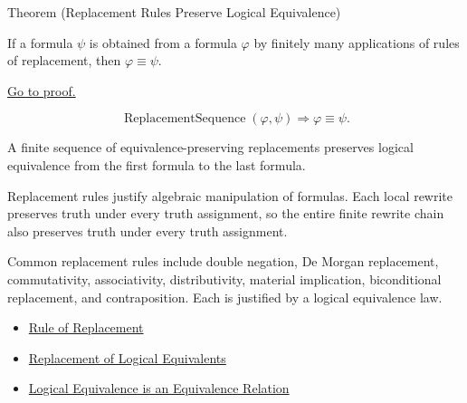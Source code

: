 \begin{theorembox}{Theorem (Replacement Rules Preserve Logical Equivalence)}
\begin{theorem}
\label{thm:replacement-rules-preserve-logical-equivalence-propositional-logic}
If a formula \(\psi\) is obtained from a formula \(\varphi\) by finitely many
applications of rules of replacement, then \(\varphi\equiv\psi\).

\noindent\hyperref[prf:replacement-rules-preserve-logical-equivalence-propositional-logic]{Go to proof.}
\end{theorem}
\end{theorembox}

\begin{remark*}
\[
\operatorname{ReplacementSequence}(\varphi,\psi)
\Longrightarrow
\varphi\equiv\psi.
\]
\end{remark*}

\begin{remark*}
A finite sequence of equivalence-preserving replacements preserves logical
equivalence from the first formula to the last formula.
\end{remark*}

\begin{remark*}[Interpretation]
Replacement rules justify algebraic manipulation of formulas. Each local rewrite
preserves truth under every truth assignment, so the entire finite rewrite chain
also preserves truth under every truth assignment.
\end{remark*}

\begin{remark*}[Exposition]
Common replacement rules include double negation, De Morgan replacement,
commutativity, associativity, distributivity, material implication, biconditional
replacement, and contraposition. Each is justified by a logical equivalence law.
\end{remark*}

\begin{dependencies}
\begin{itemize}
  \item \hyperref[def:rule-of-replacement-propositional-logic]{Rule of Replacement}
  \item \hyperref[thm:replacement-of-logical-equivalents-propositional-logic]{Replacement of Logical Equivalents}
  \item \hyperref[thm:logical-equivalence-equivalence-relation]{Logical Equivalence is an Equivalence Relation}
\end{itemize}
\end{dependencies}
